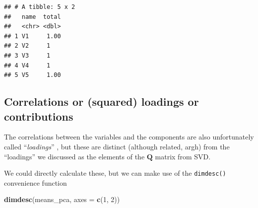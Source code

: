\documentclass[
]{book}
\newenvironment{Shaded}{\begin{snugshade}}{\end{snugshade}}
\newcommand{\AttributeTok}[1]{\textcolor[rgb]{0.13,0.29,0.53}{#1}}
\newcommand{\CommentTok}[1]{\textcolor[rgb]{0.56,0.35,0.01}{\textit{#1}}}
\newcommand{\DecValTok}[1]{\textcolor[rgb]{0.00,0.00,0.81}{#1}}
\newcommand{\FunctionTok}[1]{\textcolor[rgb]{0.13,0.29,0.53}{\textbf{#1}}}
\newcommand{\NormalTok}[1]{#1}
\newcommand{\SpecialCharTok}[1]{\textcolor[rgb]{0.81,0.36,0.00}{\textbf{#1}}}
\begin{document}
\begin{Shaded}
\end{Shaded}

\begin{verbatim}
## # A tibble: 5 x 2
##   name  total
##   <chr> <dbl>
## 1 V1     1.00
## 2 V2     1   
## 3 V3     1   
## 4 V4     1   
## 5 V5     1.00
\end{verbatim}

\subsection{Correlations or (squared) loadings or contributions}\label{correlations-or-squared-loadings-or-contributions}

The correlations between the variables and the components are also unfortunately called ``\emph{loadings}'' \citep[cf.][ for more info]{abdiPrincipal2010}, but these are distinct (although related, argh) from the ``loadings'' we discussed as the elements of the \(\mathbf Q\) matrix from SVD.

We could directly calculate these, but we can make use of the \texttt{dimdesc()} convenience function

\begin{Shaded}
\begin{Highlighting}[]
\FunctionTok{dimdesc}\NormalTok{(means\_pca, }\AttributeTok{axes =} \FunctionTok{c}\NormalTok{(}\DecValTok{1}\NormalTok{, }\DecValTok{2}\NormalTok{))}
\end{Highlighting}
\end{Shaded}
\end{document}
